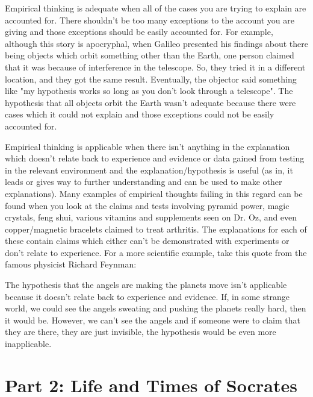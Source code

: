Empirical thinking is adequate when all of the cases you are trying to explain are accounted for. There shouldn't be too many exceptions to the account you are giving and those exceptions should be easily accounted for. For example, although this story is apocryphal, when Galileo presented his findings about there being objects which orbit something other than the Earth, one person claimed that it was because of interference in the telescope. So, they tried it in a different location, and they got the same result. Eventually, the objector said something like "my hypothesis works so long as you don't look through a telescope". The hypothesis that all objects orbit the Earth wasn't adequate because there were cases which it could not explain and those exceptions could not be easily accounted for. 

Empirical thinking is applicable when there isn't anything in the explanation which doesn't relate back to experience and evidence or data gained from testing in the relevant environment and the explanation/hypothesis is useful (as in, it leads or gives way to further understanding and can be used to make other explanations). Many examples of empirical thoughts failing in this regard can be found when you look at the claims and tests involving pyramid power, magic crystals, feng shui, various vitamins and supplements seen on Dr. Oz, and even copper/magnetic bracelets claimed to treat arthritis. The explanations for each of these contain claims which either can't be demonstrated with experiments or don't relate to experience. For a more scientific example, take this quote from the famous physicist Richard Feynman:

 The hypothesis that the angels are making the planets move isn't applicable because it doesn't relate back to experience and evidence. If, in some strange world, we could see the angels sweating and pushing the planets really hard, then it would be. However, we can't see the angels and if someone were to claim that they are there, they are just invisible, the hypothesis would be even more inapplicable.



\chapter{Part 2: Life and Times of Socrates}

